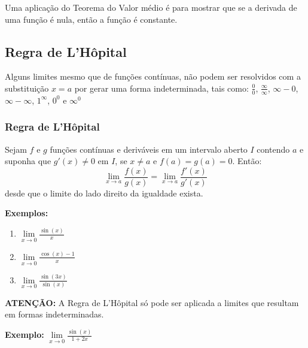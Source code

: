 \documentclass[oneside,a4paper,12pt]{article}
\begin{document}
Uma aplicação do Teorema do Valor médio é para mostrar que se a derivada de uma função é nula, então a função é constante.

\vspace{200pt}


\subsection{Regra de L'Hôpital}

Alguns limites mesmo que de funções contínuas, não podem ser resolvidos com a substituição $x=a$ por gerar uma forma indeterminada, tais como: $\frac{0}{0}$, $\frac{\infty}{\infty}$, $\infty - 0$, $\infty - \infty$, $1^{\infty}$, $0^0$ e $\infty^{0}$

\subsubsection{Regra de L'Hôpital}
Sejam $f$ e $g$ funções contínuas e deriváveis em um intervalo aberto $I$ contendo $a$ e suponha que $g'(x) \neq 0$ em $I$, se $x \neq a$ e $f(a) = g(a) = 0$. Então:
$$\lim\limits_{x \rightarrow a}\frac{f(x)}{g(x)} = \lim\limits_{x \rightarrow a}\frac{f'(x)}{g'(x)}$$
desde que o limite do lado direito da igualdade exista.

{\bf Exemplos: } 
\begin{enumerate}
	\item $\lim\limits_{x \rightarrow 0}\frac{\sin(x)}{x}$
	\item $\lim\limits_{x \rightarrow 0}\frac{\cos(x)-1}{x}$
	\item $\lim\limits_{x \rightarrow 0}\frac{\sin(3x)}{\sin(x)}$
\end{enumerate}

{\bf ATENÇÃO:} A Regra de L'Hôpital só pode ser aplicada a limites que resultam em formas indeterminadas.

{\bf Exemplo: } $\lim\limits_{x \rightarrow 0}\frac{\sin(x)}{1+2x}$

\vspace{200pt}
\end{document}
